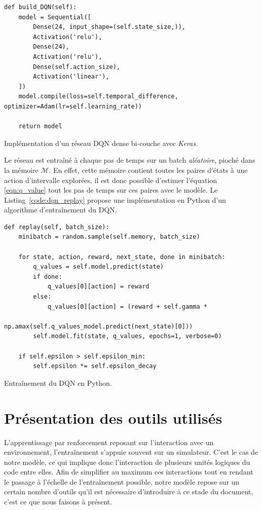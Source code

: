 \documentclass[11pt]{article}
\begin{document}
\begin{listing}[htbp]
\begin{verbatim}
def build_DQN(self):
    model = Sequential([
        Dense(24, input_shape=(self.state_size,)),
        Activation('relu'),
        Dense(24),
        Activation('relu'),
        Dense(self.action_size),
        Activation('linear'),
    ])
    model.compile(loss=self.temporal_difference, optimizer=Adam(lr=self.learning_rate))

    return model
\end{verbatim}
\caption{\label{code:build_dqn}
Implémentation d'un réseau DQN dense bi-couche avec \emph{Keras}.}
\end{listing}

Le réseau est entraîné à chaque pas de temps sur un batch \emph{aléatoire}, pioché dans la mémoire \(\mathcal{M}\). En effet, cette mémoire contient toutes les paires d'états à une action d'intervalle explorées, il est donc possible d'estimer l'équation \ref{eqn:q_value} tout les pas de temps sur ces paires avec le modèle. Le Listing \ref{code:dqn_replay} propose une implémentation en Python d'un algorithme d'entraînement du DQN.

\begin{listing}[htbp]
\begin{verbatim}
def replay(self, batch_size):
    minibatch = random.sample(self.memory, batch_size)

    for state, action, reward, next_state, done in minibatch:
        q_values = self.model.predict(state)
        if done:
            q_values[0][action] = reward
        else:
            q_values[0][action] = (reward + self.gamma *
                                  np.amax(self.q_values_model.predict(next_state)[0]))
        self.model.fit(state, q_values, epochs=1, verbose=0)

    if self.epsilon > self.epsilon_min:
        self.epsilon *= self.epsilon_decay
\end{verbatim}
\caption{\label{code:dqn_replay}
Entraînement du DQN en Python.}
\end{listing}


\section{Présentation des outils utilisés}
\label{sec:org8400efa}

L'apprentissage par renforcement reposant sur l'interaction avec un environnement, l'entraînement s'appuie souvent sur un simulateur. C'est le cas de notre modèle, ce qui implique donc l'interaction de plusieurs unités logiques du code entre elles. Afin de simplifier au maximum ces interactions tout en rendant le passage à l'échelle de l'entraînement possible, notre modèle repose sur un certain nombre d'outils qu'il est nécessaire d'introduire à ce stade du document, c'est ce que nous faisons à présent.
\end{document}
